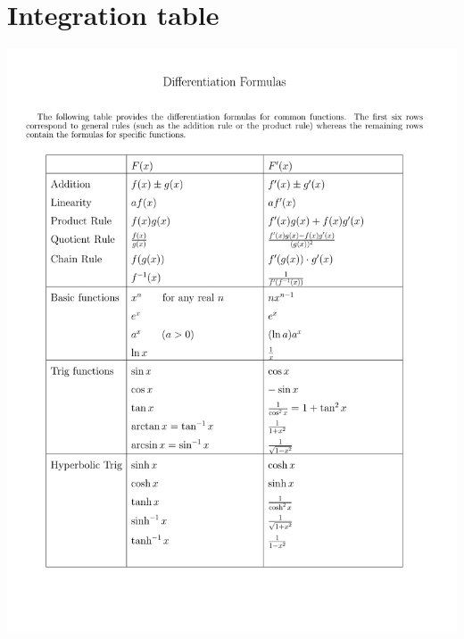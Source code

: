 \section{Integration table}

\begin{center}
\includegraphics[page=2,width=18cm,trim=1.25cm 3cm 4.5cm 4cm,clip]{Content/Tabellen/calcrulz.pdf}
\end{center}

\vfill
